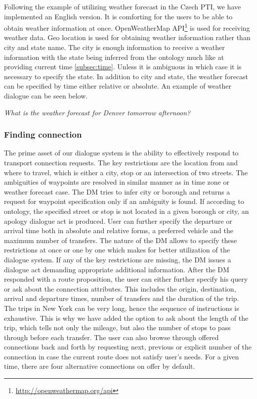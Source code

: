 Following the example of utilizing weather forecast in the Czech PTI, we have implemented an English version.
It is comforting for the users to be able to obtain weather information at once.
OpenWeatherMap API\footnote{\url{http://openweathermap.org/api}} is used for receiving weather data.
Geo location is used for obtaining weather information rather than city and state name.
The city is enough information to receive a weather information with the state being inferred from the ontology much like at providing current time \ref{subsec:time}.
Unless it is ambiguous in which case it is necessary to specify the state.
In addition to city and state, the weather forecast can be specified by time either relative or absolute.
An example of weather dialogue can be seen below.

\begin{flushleft}
\textit{What is the weather forecast for Denver tomorrow afternoon?}
\textit{}
\end{flushleft}

\subsubsection{Finding connection}

The prime asset of our dialogue system is the ability to effectively respond to transport connection requests.
The key restrictions are the location from and where to travel, which is either a city, stop or an intersection of two streets.
The ambiguities of waypoints are resolved in similar manner as in time zone or weather forecast case.
The DM tries to infer city or borough and returns a request for waypoint specification only if an ambiguity is found.
If according to ontology, the specified street or stop is not located in a given borough or city, an apology dialogue act is produced.
User can further specify the departure or arrival time both in absolute and relative forms, a preferred vehicle and the maximum number of transfers.
The nature of the DM allows to specify these restrictions at once or one by one which makes for better utilization of the dialogue system.
If any of the key restrictions are missing, the DM issues a dialogue act demanding appropriate additional information.
After the DM responded with a route proposition, the user can either further specify his query or ask about the connection attributes.
This includes the origin, destination, arrival and departure times, number of transfers and the duration of the trip.
The trips in New York can be very long, hence the sequence of instructions is exhaustive.
This is why we have added the option to ask about the length of the trip, which tells not only the mileage, but also the number of stops to pass through before each transfer.
The user can also browse through offered connections back and forth by requesting next, previous or explicit number of the connection in case the current route does not satisfy user's needs.
For a given time, there are four alternative connections on offer by default.

